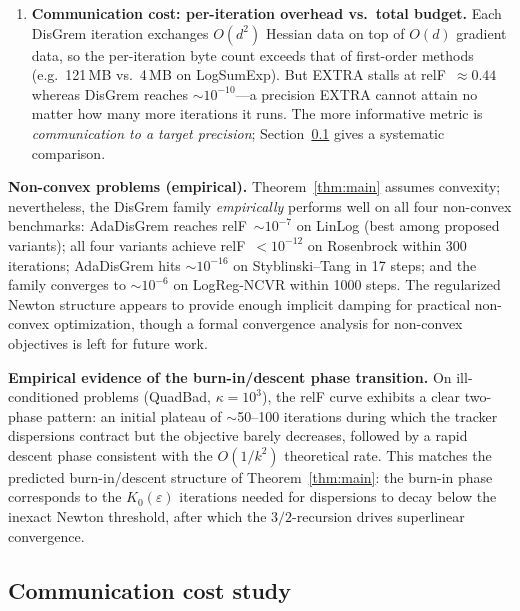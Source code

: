 \documentclass[10pt,twocolumn,letterpaper]{article}
\def\cO{O}%
\theoremstyle{compact}
\theoremstyle{compactremark}
\newcommand{\cO}{\mathcal{O}}
\begin{document}
\begin{enumerate}[leftmargin=1.4em,itemsep=2pt]
		\item \textbf{Communication cost: per-iteration overhead vs.\
			total budget.}
		Each DisGrem iteration exchanges $\cO(d^2)$ Hessian data on
		top of $\cO(d)$ gradient data, so the per-iteration byte count
		exceeds that of first-order methods
		(e.g.\ 121\,MB vs.\ 4\,MB on LogSumExp).
		But EXTRA stalls at relF~$\approx0.44$ whereas DisGrem reaches
		$\sim10^{-10}$---a precision EXTRA cannot attain no matter how
		many more iterations it runs.
		The more informative metric is \emph{communication to a
		target precision}; Section~\ref{ssec:commexp} gives a
		systematic comparison.
	\end{enumerate}
	
	\noindent\textbf{Non-convex problems (empirical).}
	Theorem~\ref{thm:main} assumes convexity; nevertheless, the
	DisGrem family \emph{empirically} performs well on all four
	non-convex benchmarks:
	AdaDisGrem reaches relF~$\sim10^{-7}$ on LinLog (best among
	proposed variants); all four variants achieve relF~$<10^{-12}$
	on Rosenbrock within 300 iterations; AdaDisGrem hits $\sim10^{-16}$
	on Styblinski--Tang in 17 steps; and the family converges to
	$\sim10^{-6}$ on LogReg-NCVR within 1000 steps.
	The regularized Newton structure appears to provide enough
	implicit damping for practical non-convex optimization, though
	a formal convergence analysis for non-convex objectives is
	left for future work.
	
	\noindent\textbf{Empirical evidence of the burn-in/descent phase transition.}
	On ill-conditioned problems (QuadBad, $\kappa{=}10^3$), the relF
	curve exhibits a clear two-phase pattern: an initial plateau of
	$\sim$50--100 iterations during which the tracker dispersions
	contract but the objective barely decreases, followed by a rapid
	descent phase consistent with the $\cO(1/k^2)$ theoretical rate.
	This matches the predicted burn-in/descent structure of
	Theorem~\ref{thm:main}: the burn-in phase corresponds to the
	$K_0(\varepsilon)$ iterations needed for dispersions to decay below
	the inexact Newton threshold, after which the $3/2$-recursion
	drives superlinear convergence.
	
	\subsection{Communication cost study}\label{ssec:commexp}
	
\end{document}
